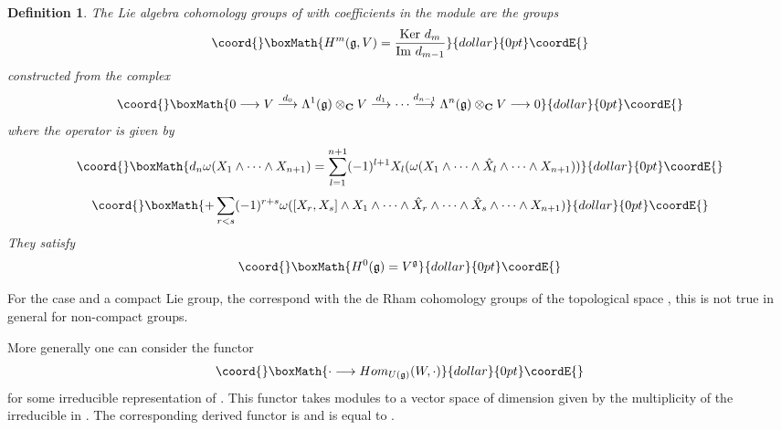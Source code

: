 \documentclass[a4paper,a4paper]{article}
\newtheorem{define}{Definition}
\theoremstyle{conjecture}
\begin{document}
\begin{define}
The Lie algebra cohomology groups of \coordHE{} with coefficients in the \coordHE{} module \coordHE{}
are the groups
$$\coord{}\boxMath{H^m(\mathfrak g, V)=\frac{\mathrm{Ker\ }d_m}{\mathrm{Im\ }d_{m-1}}}{dollar}{0pt}\coordE{}$$
constructed from the complex
$$\coord{}\boxMath{0\longrightarrow V\stackrel{d_0}\longrightarrow \Lambda^1(\mathfrak g)\otimes_{\mathbf C}V
\stackrel{d_1}\longrightarrow\cdots\stackrel{d_{n-1}}\longrightarrow\Lambda^n(\mathfrak g)\otimes_{\mathbf C}V
\longrightarrow 0}{dollar}{0pt}\coordE{}$$
where the operator \coordHE{} is given by
$$\coord{}\boxMath{d_n\omega(X_1\wedge\cdots\wedge X_{n+1})=\sum_{l=1}^{n+1}(-1)^{l+1}X_l(\omega(X_1\wedge\cdots\wedge\hat X_l
\wedge\cdots\wedge X_{n+1}))}{dollar}{0pt}\coordE{}$$  $$\coord{}\boxMath{+\sum_{r<s}(-1)^{r+s}\omega([X_r,X_s]\wedge X_1\wedge\cdots\wedge\hat X_r\wedge\cdots\wedge\hat X_s
\wedge\cdots\wedge X_{n+1})}{dollar}{0pt}\coordE{}$$
They satisfy
$$\coord{}\boxMath{H^0(\mathfrak g)=V^{\mathfrak g}}{dollar}{0pt}\coordE{}$$
\end{define}

For the case \coordHE{} and \coordHE{} a compact Lie group, the \coordHE{} correspond
with the de Rham cohomology groups of the topological space \coordHE{}, this is not true in general
for non-compact groups.

More generally one can consider the functor
$$\coord{}\boxMath{\cdot\longrightarrow Hom_{U(\mathfrak g)}(W,\cdot)}{dollar}{0pt}\coordE{}$$
for some irreducible representation \coordHE{} of \coordHE{}. This functor takes \coordHE{}
modules to a vector space of dimension given by the multiplicity of the irreducible
\coordHE{} in \coordHE{}.  The corresponding derived functor is
\coordHE{} and is equal to
\coordHE{}.
\end{document}
